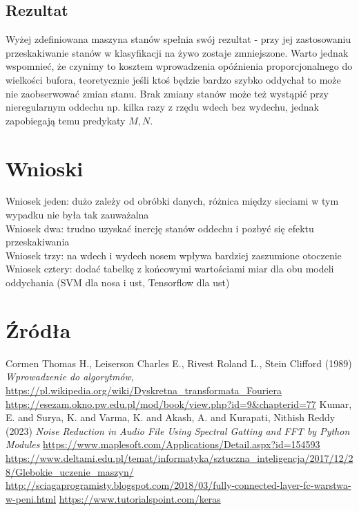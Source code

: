 \documentclass[polish]{article}
\begin{document}
\subsection{Rezultat}
Wyżej zdefiniowana maszyna stanów spełnia swój rezultat - przy jej zastosowaniu przeskakiwanie stanów w klasyfikacji na żywo zostaje zmniejszone. 
Warto jednak wspomnieć, że czynimy to kosztem wprowadzenia opóźnienia proporcjonalnego
do wielkości bufora, teoretycznie jeśli ktoś będzie bardzo szybko oddychał to może nie zaobserwować zmian stanu. Brak zmiany stanów może też wystąpić przy nieregularnym oddechu np. kilka razy z rzędu
wdech bez wydechu, jednak zapobiegają temu predykaty $M,N$. 
\section{Wnioski}
Wniosek jeden: dużo zależy od obróbki danych, różnica między sieciami w tym wypadku nie była tak zauważalna \\
Wniosek dwa: trudno uzyskać inercję stanów oddechu i pozbyć się efektu przeskakiwania \\
Wniosek trzy: na wdech i wydech nosem wpływa bardziej zaszumione otoczenie
Wniosek cztery: dodać tabelkę z końcowymi wartościami miar dla obu modeli oddychania (SVM dla nosa i ust, Tensorflow dla ust)
\section{Źródła}
\begin{thebibliography}{2}
 Cormen Thomas H., Leiserson Charles E., Rivest Roland L., Stein Clifford (1989) \emph{Wprowadzenie do algorytmów},
\url{https://pl.wikipedia.org/wiki/Dyskretna_transformata_Fouriera}
\url{https://esezam.okno.pw.edu.pl/mod/book/view.php?id=9&chapterid=77}
Kumar, E. and Surya, K. and Varma, K. and Akash, A. and Kurapati, Nithish Reddy (2023) \emph{Noise Reduction in Audio File Using Spectral Gatting and FFT by Python Modules}
\url{https://www.maplesoft.com/Applications/Detail.aspx?id=154593}
\url{https://www.deltami.edu.pl/temat/informatyka/sztuczna_inteligencja/2017/12/28/Glebokie_uczenie_maszyn/}
\url{http://sciagaprogramisty.blogspot.com/2018/03/fully-connected-layer-fc-warstwa-w-peni.html}
\url{https://www.tutorialspoint.com/keras}
\end{thebibliography}
\end{document}
